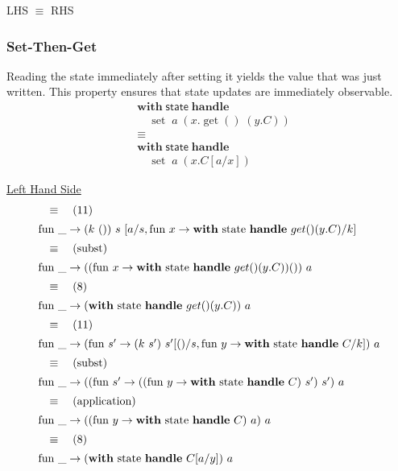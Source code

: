\documentclass[logo,bsc,singlespacing,parskip]{infthesis}
\begin{document}
LHS $\equiv$ RHS



\subsubsection*{Set-Then-Get}
Reading the state immediately after setting it yields the value that was just written. This property ensures that state updates are immediately observable.
\[
\begin{aligned}
    &\mathsf{\textbf{with}} \; \mathsf{state} \; \mathsf{\textbf{handle}} \\
    &\quad \operatorname{set} \; a \; (x. \operatorname{get}() \; (y. C)) \\
    &\equiv \\
    &\mathsf{\textbf{with}} \; \mathsf{state} \; \mathsf{\textbf{handle}} \\
    &\quad \operatorname{set} \; a \; (x. C[a/x])
\end{aligned}
\]

\underline{Left Hand Side}
\[ 
\begin{array}{l}
\quad\equiv\quad (11) \\[5pt]
\text{fun }\_ \rightarrow (k\ ())\ s\ [a/s, \text{fun } x \rightarrow \text{\textbf{with} state \textbf{handle} } get() (y. C)/k] \\[5pt]
\quad\equiv\quad (\text{subst}) \\[5pt]
\text{fun }\_ \rightarrow ((\text{fun } x \rightarrow \text{\textbf{with} state \textbf{handle} } get() (y. C)) ())\ a \\[5pt]
\quad\equiv\quad (8) \\[5pt]
\text{fun }\_ \rightarrow (\text{\textbf{with} state \textbf{handle} } get() (y. C))\ a \\[5pt]
\quad\equiv\quad (11) \\[5pt]
\text{fun }\_ \rightarrow (\text{fun } s' \rightarrow  (k\ s')\ s' [()/s, \text{fun } y \rightarrow \text{\textbf{with} state \textbf{handle} } C / k])\ a \\[5pt]
\quad\equiv\quad (\text{subst}) \\[5pt]
\text{fun }\_ \rightarrow ((\text{fun } s' \rightarrow ((\text{fun } y \rightarrow \text{\textbf{with} state \textbf{handle} } C)\ s' )\ s')\ a \\[5pt]
\quad\equiv\quad (\text{application}) \\[5pt]
\text{fun }\_ \rightarrow ((\text{fun } y \rightarrow \text{\textbf{with} state \textbf{handle} } C)\ a )\ a \\[5pt]
\quad\equiv\quad (8) \\[5pt]
\text{fun }\_ \rightarrow (\text{\textbf{with} state \textbf{handle} } C[a/y])\ a
\end{array}
\]
\end{document}
